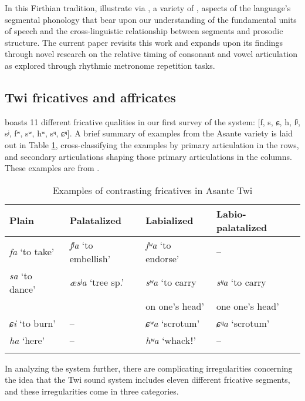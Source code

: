 \documentclass[output=paper,colorlinks,citecolor=brown]{langscibook}
\begin{document}
In this Firthian tradition, \citet{deJongObeng2000} illustrate via , a variety of , aspects of the language's segmental phonology that bear upon our understanding of the fundamental units of speech and the cross-linguistic relationship between segments and prosodic structure. The current paper revisits this work and expands upon its findings through novel research on the relative timing of consonant and vowel articulation as explored through rhythmic metronome repetition tasks.


\subsection{Twi fricatives and affricates}\largerpage

 boasts 11 different fricative qualities in our first survey of the system: [f, s, ɕ, h, fʲ, sʲ, fʷ, sʷ, hʷ, sᶣ, ɕᶣ]. A brief summary of examples from the Asante variety is laid out in Table \ref{tab:ConsContrast}, cross-classifying the examples by primary articulation in the rows, and secondary articulations shaping those primary articulations in the columns. These examples are from \citet[686--687]{deJongObeng2000}.

\begin{table}
\caption{Examples of contrasting fricatives in Asante Twi}
\label{tab:ConsContrast}
 \begin{tabular}{llll}
 \lsptoprule
 {Plain} & {Palatalized} & {Labialized} & {Labio-palatalized}\\
 \midrule
 \textit{fa} `to take' & \textit{fʲa} `to embellish' & \textit{fʷa} `to endorse' & -- \\ 
 \textit{sa} `to dance' & \textit{æsʲa } `tree sp.' & \textit{sʷa} `to carry & \textit{sᶣa} `to carry \\
 & & on one's head' & one one's head'\\
 \textit{ɕi} `to burn' & -- & \textit{ɕʷa} `scrotum' & \textit{ɕᶣa} `scrotum' \\
 \textit{ha} `here' & -- & \textit{hʷa} `whackǃ' & -- \\
 \lspbottomrule
 \end{tabular}
\end{table}


In analyzing the system further, there are complicating irregularities concerning the idea that the Twi sound system includes eleven different fricative segments, and these irregularities come in three categories.\largerpage
\end{document}
